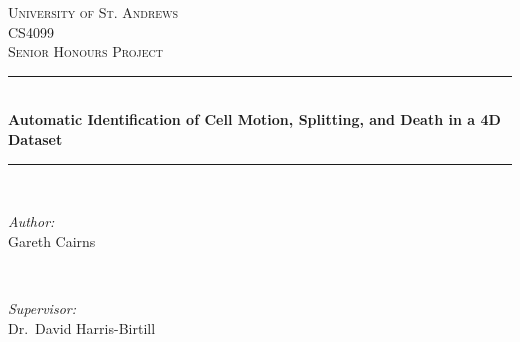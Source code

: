 \documentclass[12pt a4paper]{article}
\begin{document}
\begin{titlepage}

\newcommand{\HRule}{\rule{\linewidth}{0.5mm}} %

\center %
 

\textsc{\LARGE University of St. Andrews}\\[1.5cm] %
\textsc{\Large CS4099}\\[0.5cm] %
\textsc{\large Senior Honours Project}\\[0.5cm] %


\HRule \\[0.4cm]
{ \large \bfseries Automatic Identification of Cell Motion, Splitting, and Death in a 4D Dataset\\[0.4cm]} %
\HRule \\[1.5cm]
 

\begin{minipage}{0.4\textwidth}
\begin{flushleft} \large
\emph{Author:}\\
Gareth Cairns %
\end{flushleft}
\end{minipage}
~
\begin{minipage}{0.4\textwidth}
\begin{flushright} \large
\emph{Supervisor:} \\
Dr.~David Harris-Birtill%
\end{flushright}
\end{minipage}\\[2cm]



\end{titlepage}
\end{document}
